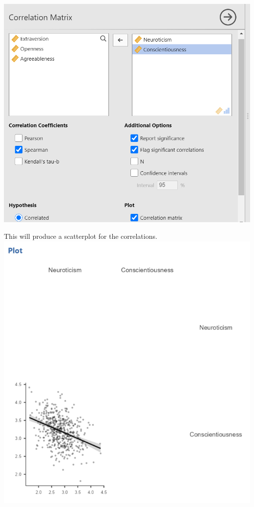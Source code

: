 \documentclass[
]{book}
\begin{document}
\includegraphics{img/Correlation_CommandsWithPlot.png}

This will produce a scatterplot for the correlations.
\includegraphics{img/Correlation_Plot.png}
\end{document}
